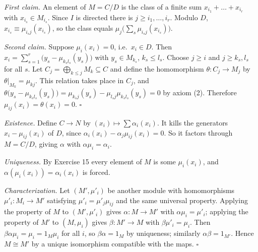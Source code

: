 \documentclass[11pt]{article}
\begin{document}
\pf
\emph{First claim.} An element of $M=C/D$ is the class of a finite sum $x_{i_1}+\dots+x_{i_r}$ with $x_{i_s}\in M_{i_s}$. Since $I$ is directed there is $j\ge i_1,\dots,i_r$. Modulo $D$, $x_{i_s}\equiv\mu_{i_sj}(x_{i_s})$, so the class equals $\mu_j\bigl(\sum_s\mu_{i_sj}(x_{i_s})\bigr)$.

\emph{Second claim.} Suppose $\mu_i(x_i)=0$, i.e.\ $x_i\in D$. Then $x_i=\sum_{s=1}^r\bigl(y_s-\mu_{k_sl_s}(y_s)\bigr)$ with $y_s\in M_{k_s}$, $k_s\le l_s$. Choose $j\ge i$ and $j\ge k_s,l_s$ for all $s$. Let $C_j=\bigoplus_{k\le j}M_k\subseteq C$ and define the homomorphism $\theta:C_j\to M_j$ by $\theta|_{M_k}=\mu_{kj}$. This relation takes place in $C_j$, and
$\theta\bigl(y_s-\mu_{k_sl_s}(y_s)\bigr)=\mu_{k_sj}(y_s)-\mu_{l_sj}\mu_{k_sl_s}(y_s)=0$ by axiom (2). Therefore $\mu_{ij}(x_i)=\theta(x_i)=0$. \hfill$\square$

\pf
\emph{Existence.} Define $C\to N$ by $(x_i)\mapsto\sum\alpha_i(x_i)$. It kills the generators $x_i-\mu_{ij}(x_i)$ of $D$, since $\alpha_i(x_i)-\alpha_j\mu_{ij}(x_i)=0$. So it factors through $M=C/D$, giving $\alpha$ with $\alpha\mu_i=\alpha_i$.

\emph{Uniqueness.} By Exercise 15 every element of $M$ is some $\mu_i(x_i)$, and $\alpha(\mu_i(x_i))=\alpha_i(x_i)$ is forced.

\emph{Characterization.} Let $(M',\mu'_i)$ be another module with homomorphisms $\mu'_i:M_i\to M'$ satisfying $\mu'_i=\mu'_j\mu_{ij}$ and the same universal property. Applying the property of $M$ to $(M',\mu'_i)$ gives $\alpha:M\to M'$ with $\alpha\mu_i=\mu'_i$; applying the property of $M'$ to $(M,\mu_i)$ gives $\beta:M'\to M$ with $\beta\mu'_i=\mu_i$. Then $\beta\alpha\mu_i=\mu_i=1_M\mu_i$ for all $i$, so $\beta\alpha=1_M$ by uniqueness; similarly $\alpha\beta=1_{M'}$. Hence $M\cong M'$ by a unique isomorphism compatible with the maps. \hfill$\square$
\end{document}

